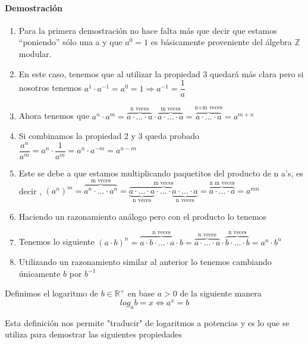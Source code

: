 \paragraph{Demostración}
\begin{enumerate}
\item Para la primera demostración no hace falta más que decir que estamos ``poniendo'' sólo una a y que $a^0=1$ es básicamente proveniente del álgebra $\mathbb{Z}$ modular.
 
\item En este caso,  tenemos que al utilizar la propiedad 3 quedará más clara pero si nosotros tenemos $a^1 \cdot a^{-1}=a^0=1 \Rightarrow a^{-1}=\dfrac{1}{a}$

\item Ahora tenemos que $a^n\cdot a^m=\overbrace{a \cdot\ldots \cdot a}^{\text{n veces}}\cdot \overbrace{a \cdot\ldots \cdot a}^{\text{m veces}}=\overbrace{a \cdot\ldots \cdot a}^{\text{n+m veces}}=a^{m+n}$
\item Si combinamos la propiedad 2 y 3 queda probado $\dfrac{a^n}{a^m}=a^n\cdot \dfrac{1}{a^m}=a^n \cdot a^{-m}=a^{n-m}$
\item Este se debe a que estamos multiplicando paquetitos del producto de n a's, es decir ,
$ \left( a^n \right) ^m =\overbrace{a^n \cdot \ldots \cdot a^n}^{\text{m veces}}=\overbrace{\underbrace{a \cdot \ldots \cdot a}_{\text{n veces}}\cdot \ldots \cdot \underbrace{a \cdot\ldots \cdot a}_{\text{n veces}}}^{\text{m veces}}=\overbrace{a \cdot\ldots \cdot a}^{\text{n m veces}}=a^{m n}$
\item Haciendo un razonamiento análogo pero con el producto lo tenemos 
\item Tenemos lo siguiente $(a \cdot b)^n=\overbrace{a\cdot b \cdot\ldots \cdot a\cdot b}^{\text{n veces}}=\overbrace{a \cdot\ldots \cdot a}^{\text{n veces}}\cdot \overbrace{b \cdot\ldots \cdot b}^{\text{n veces}}=a^n \cdot b^n$
\item Utilizando un razonamiento similar al anterior lo tenemos cambiando únicamente $b$ por $b^{-1}$
\end{enumerate}

\begin{defi}
Definimos el logaritmo de $b \in \mathbb{R}^+$ en base $a>0$ de la siguiente manera
\begin{equation}
log_a b=x \Leftrightarrow a^x=b
\end{equation}
\end{defi}

Esta definición nos permite "traducir" de logaritmos a potencias y es lo que se utiliza para demostrar las siguientes propiedades
